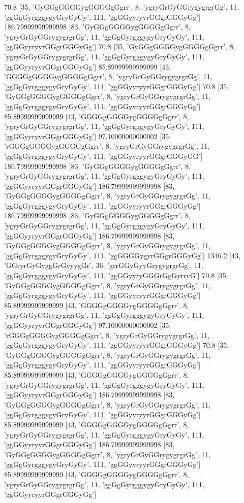 70.8 [35, 'GyGGgGGGGygGGGGgGgrr', 8, 'ygryGrGyGGrygygrgrGg', 11, 'ggGgGyrgggygyGryGyGy', 111, 'ggGGyyryyrGGgrGGGyGg']
186.79999999999998 [83, 'GyGGgGGGGygGGGGgGgrr', 8, 'ygryGrGyGGrygygrgrGg', 11, 'ggGgGyrgggygyGryGyGy', 111, 'ggGGyyryyrGGgrGGGyGg']
70.8 [35, 'GyGGgGGGGygGGGGgGgrr', 8, 'ygryGrGyGGrygygrgrGg', 11, 'ggGgGyrgggygyGryGyGy', 111, 'ggGGyyryyrGGgrGGGyGg']
85.89999999999999 [43, 'GGGGgGGGGygGGGGgGgrr', 8, 'ygryGrGyGGrygygrgrGg', 11, 'ggGgGyrgggygyGryGyGy', 111, 'ggGGyyryyrGGgrGGGyGg']
70.8 [35, 'GyGGgGGGGygGGGGgGgrr', 8, 'ygryGrGyGGrygygrgrGg', 11, 'ggGgGyrgggygyGryGyGy', 111, 'ggGGyyryyrGGgrGGGyGg']
85.89999999999999 [43, 'GGGGgGGGGygGGGGgGgrr', 8, 'ygryGrGyGGrygygrgrGg', 11, 'ggGgGyrgggygyGryGyGy', 111, 'ggGGyyryyrGGgrGGGyGg']
97.10000000000002 [35, 'rGGGgGGGGygGGGGgGgrr', 8, 'ygryGrGyGGrygygrgrGg', 11, 'ggGgGyrgggygyGryGyGy', 111, 'ggGGyyryyrGGgrGGGyGG']
186.79999999999998 [83, 'GyGGgGGGGygGGGGgGgrr', 8, 'ygryGrGyGGrygygrgrGg', 11, 'ggGgGyrgggygyGryGyGy', 111, 'ggGGyyryyrGGgrGGGyGg']
186.79999999999998 [83, 'GyGGgGGGGygGGGGgGgrr', 8, 'ygryGrGyGGrygygrgrGg', 11, 'ggGgGyrgggygyGryGyGy', 111, 'ggGGyyryyrGGgrGGGyGg']
186.79999999999998 [83, 'GyGGgGGGGygGGGGgGgrr', 8, 'ygryGrGyGGrygygrgrGg', 11, 'ggGgGyrgggygyGryGyGy', 111, 'ggGGyyryyrGGgrGGGyGg']
186.79999999999998 [83, 'GyGGgGGGGygGGGGgGgrr', 8, 'ygryGrGyGGrygygrgrGg', 11, 'ggGgGyrgggygyGryGyGy', 111, 'ggGGGGygyrGGgrGGGyGg']
1346.2 [43, 'GGryrGyGyggGrGyyygGr', 36, 'grrGGyGyyGrygygrgrGg', 11, 'ggGgGyrgggygyGryGyGy', 111, 'ggGGyyryGGGrGgGyrryG']
70.8 [35, 'GyGGgGGGGygGGGGgGgrr', 8, 'ygryGrGyGGrygygrgrGg', 11, 'ggGgGyrgggygyGryGyGy', 111, 'ggGGyyryyrGGgrGGGyGg']
85.89999999999999 [43, 'GGGGgGGGGygGGGGgGgrr', 8, 'ygryGrGyGGrygygrgrGg', 11, 'ggGgGyrgggygyGryGyGy', 111, 'ggGGyyryyrGGgrGGGyGg']
97.10000000000002 [35, 'rGGGgGGGGygGGGGgGgrr', 8, 'ygryGrGyGGrygygrgrGg', 11, 'ggGgGyrgggygyGryGyGy', 111, 'ggGGyyryyrGGgrGGGyGg']
70.8 [35, 'GyGGgGGGGygGGGGgGgrr', 8, 'ygryGrGyGGrygygrgrGg', 11, 'ggGgGyrgggygyGryGyGy', 111, 'ggGGyyryyrGGgrGGGyGg']
85.89999999999999 [43, 'GGGGgGGGGygGGGGgGgrr', 8, 'ygryGrGyGGrygygrgrGg', 11, 'ggGgGyrgggygyGryGyGy', 111, 'ggGGyyryyrGGgrGGGyGg']
186.79999999999998 [83, 'GyGGgGGGGygGGGGgGgrr', 8, 'ygryGrGyGGrygygrgrGg', 11, 'ggGgGyrgggygyGryGyGy', 111, 'ggGGyyryyrGGgrGGGyGg']
85.89999999999999 [43, 'GGGGgGGGGygGGGGgGgrr', 8, 'ygryGrGyGGrygygrgrGg', 11, 'ggGgGyrgggygyGryGyGy', 111, 'ggGGyyryyrGGgrGGGyGg']
186.79999999999998 [83, 'GyGGgGGGGygGGGGgGgrr', 8, 'ygryGrGyGGrygygrgrGg', 11, 'ggGgGyrgggygyGryGyGy', 111, 'ggGGyyryyrGGgrGGGyGg']
85.89999999999999 [43, 'GGGGgGGGGygGGGGgGgrr', 8, 'ygryGrGyGGrygygrgrGg', 11, 'ggGgGyrgggygyGryGyGy', 111, 'ggGGyyryyrGGgrGGGyGg']
